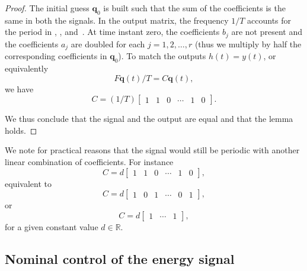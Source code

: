 \begin{proof}
The initial guess $\mathbf{q}_0$ is built such that the sum of the coefficients is the same in both the signals. In the output matrix, the frequency $1/T$ accounts for the period in , , and~. At time instant zero, the coefficients $b_j$ are not present and the coefficients $a_j$ are doubled for each $j=1,2,\dots,r$ (thus we multiply by half the corresponding coefficients in $\mathbf{q}_0$). To match the outputs $h(t)=y(t)$, or equivalently 
\begin{equation}
  F\mathbf{q}(t)/T=C\mathbf{q}(t), 
\end{equation}
we have 
\begin{equation}
  C=(1/T)\begin{bmatrix}1 & 1 & 0 & \cdots & 1 & 0\end{bmatrix}.
\end{equation}

We thus conclude that the signal and the output are equal and that the lemma holds.

\end{proof}

We note for practical reasons that the signal would still be periodic with another linear combination of coefficients. For instance
\begin{equation}\label{eq:mat_C_generic}
  C=d\begin{bmatrix}1 & 1 & 0 & \cdots & 1 & 0\end{bmatrix},
\end{equation} 
equivalent to
\begin{equation}
  C=d\begin{bmatrix}1 & 0 & 1 & \cdots & 0 & 1\end{bmatrix},
\end{equation} 
or 
\begin{equation}
  C=d\begin{bmatrix}1 & \cdots & 1\end{bmatrix},
\end{equation} 
for a given constant value $d\in\mathbb{R}$.

\subsection{Nominal control of the energy signal}
\label{sec:nom-cont}

